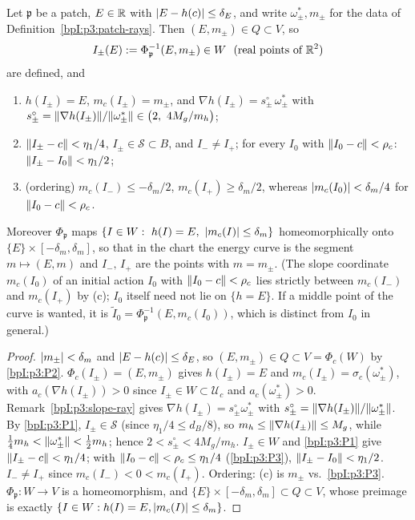 \begin{lemma}\label{bpI:p3:points}
Let $\mathfrak p$ be a patch, $E\in\mathbb{R}$ with $\lvert E-h(c)\rvert\le\delta_E$, and write $\omega^*_\pm,m_\pm$ for the data of Definition~\ref{bpI:p3:patch-rays}.
Then $(E,m_\pm)\in Q\subset V$, so
\[
I_\pm(E):=\Phi_{\mathfrak p}^{-1}(E,m_\pm)\in W\ \ (\text{real points of }\mathbb{R}^2)
\]
are defined, and
\begin{enumerate}[label=(\alph*)]
\item $h(I_\pm)=E$, $m_c(I_\pm)=m_\pm$, and $\nabla h(I_\pm)=s^\circ_\pm\,\omega^*_\pm$ with $s^\circ_\pm=\norm{\nabla h(I_\pm)}/\norm{\omega^*_\pm}\in\bigl(2,\ 4M_g/m_h\bigr)$;
\item $\lVert I_\pm-c\rVert<\eta_1/4$, $I_\pm\in\mathcal S\subset B$, and $I_-\ne I_+$; for every $I_0$ with $\lVert I_0-c\rVert<\rho_c$: $\lVert I_\pm-I_0\rVert<\eta_1/2$;
\item (ordering) $m_c(I_-)\le-\delta_m/2$, $m_c(I_+)\ge\delta_m/2$, whereas $\lvert m_c(I_0)\rvert<\delta_m/4$ for $\lVert I_0-c\rVert<\rho_c$.
\end{enumerate}
Moreover $\Phi_{\mathfrak p}$ maps $\{I\in W:\ h(I)=E,\ \abs{m_c(I)}\le\delta_m\}$ homeomorphically onto $\{E\}\times[-\delta_m,\delta_m]$, so that in the chart the energy curve is the segment $m\mapsto(E,m)$ and
$I_-,\,I_+$ are the points with $m=m_\pm$. (The slope coordinate $m_c(I_0)$ of an initial action $I_0$ with $\lVert I_0-c\rVert<\rho_c$ lies strictly between $m_c(I_-)$ and $m_c(I_+)$ by (c); $I_0$ itself need not lie on $\{h=E\}$. If a middle point of the curve is wanted, it is $\tilde I_0=\Phi_{\mathfrak p}^{-1}(E,m_c(I_0))$, which is distinct from $I_0$ in general.)
\end{lemma}
\begin{proof}
\label{stepI:p3:pt-exist}
$\lvert m_\pm\rvert<\delta_m$ and $\lvert E-h(c)\rvert\le\delta_E$, so $(E,m_\pm)\in Q\subset V=\Phi_c(W)$ by \ref{bpI:p3:P2}.
\label{stepI:p3:pt-parallel}
$\Phi_c(I_\pm)=(E,m_\pm)$ gives $h(I_\pm)=E$ and $m_c(I_\pm)=\sigma_c(\omega^*_\pm)$, with $a_c(\nabla h(I_\pm))>0$ since $I_\pm\in W\subset\mathcal U_c$ and $a_c(\omega^*_\pm)>0$.
Remark~\ref{bpI:p3:slope-ray} gives $\nabla h(I_\pm)=s^\circ_\pm\omega^*_\pm$ with $s^\circ_\pm=\lVert \nabla h(I_\pm)\rVert/\lVert \omega^*_\pm\rVert$.
By \ref{bpI:p3:P1}, $I_\pm\in\mathcal S$ (since $\eta_1/4\le d_B/8$), so $m_h\le\lVert \nabla h(I_\pm)\rVert\le M_g$, while $\tfrac14m_h<\lVert \omega^*_\pm\rVert<\tfrac12m_h$; hence $2<s^\circ_\pm<4M_g/m_h$.
\label{stepI:p3:pt-position}
$I_\pm\in W$ and \ref{bpI:p3:P1} give $\lVert I_\pm-c\rVert<\eta_1/4$; with $\lVert I_0-c\rVert<\rho_c\le\eta_1/4$ (\ref{bpI:p3:P3}), $\lVert I_\pm-I_0\rVert<\eta_1/2$. $I_-\ne I_+$ since $m_c(I_-)<0<m_c(I_+)$. Ordering: (c) is $m_\pm$ vs.\ \ref{bpI:p3:P3}.
\label{stepI:p3:pt-segment}
$\Phi_{\mathfrak p}:W\to V$ is a homeomorphism, and $\{E\}\times[-\delta_m,\delta_m]\subset Q\subset V$, whose preimage is exactly $\{I\in W:h(I)=E,\lvert m_c(I)\rvert\le\delta_m\}$.
\end{proof}

